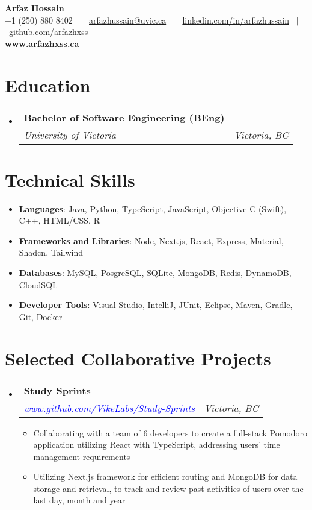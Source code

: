 \documentclass[a4paper,10pt]{article}
\makeatletter
\newcommand{\TechSkillItems}[2]{
  \item \normalsize{\textbf{#1}{: #2}}
}
\newcommand{\resumeItemDot}[1]{
  \item \normalsize{#1}
}
\newcommand{\resumeSubheading}[4]{
  \item
    \begin{tabular*}{\dimexpr\textwidth-1.2em\relax}{@{}l@{\extracolsep{\fill}}r@{}}
      \large \textbf{#1} & \text{#2} \\
      \textit{#3} & \textit{#4} \\
    \end{tabular*}\vspace{-2pt}
}
\newcommand{\resumeSubItem}[2]{\TechSkillItems{#1}{#2}}
\newenvironment{resumeSubHeadingListStart}
{\begin{itemize}[leftmargin=0.15in, label={}]}
{\end{itemize}}
\newenvironment{resumeItemListStart}
{\begin{itemize}[leftmargin=0.15in, label={$\bullet$}]}
{\end{itemize}}
\makeatother
\begin{document}
\begin{center}
    \textbf{\huge Arfaz Hossain} \\ \vspace{2pt}
    +1 (250) 880 8402 \ $|$ \
    \href{mailto:arfazhussain@uvic.ca}
    {arfazhussain@uvic.ca} \ $|$ \ 
    \href{https://www.linkedin.com/in/arfazhussain}{linkedin.com/in/arfazhussain} \ $|$ \ 
    \href{https://github.com/arfazhxss}{github.com/arfazhxss} \vspace{2pt} \\
    \href{https://www.arfazhxss.ca}{\large \textbf{www.arfazhxss.ca}}
\end{center}

\section{Education}
\begin{resumeSubHeadingListStart}
\resumeSubheading
    {Bachelor of Software Engineering (BEng)}
    {Sept. 2021 – Present}
    {University of Victoria}
    {Victoria, BC}
\end{resumeSubHeadingListStart}

\section{Technical Skills}
\begin{resumeSubHeadingListStart}
\resumeSubItem{Languages}{Java, Python, TypeScript, JavaScript, Objective-C (Swift), C++, HTML/CSS, R}
\resumeSubItem{Frameworks and Libraries}{Node, Next.js, React, Express, Material, Shadcn, Tailwind}
\resumeSubItem{Databases}{MySQL, PosgreSQL, SQLite, MongoDB, Redis, DynamoDB, CloudSQL}
\resumeSubItem{Developer Tools}{Visual Studio, IntelliJ, JUnit, Eclipse, Maven, Gradle, Git, Docker}
\end{resumeSubHeadingListStart}

\section{Selected Collaborative Projects}
\begin{resumeSubHeadingListStart}
\resumeSubheading
    {Study Sprints}
    {Feb 2024 – Present}
    {\textcolor{blue}{www.github.com/VikeLabs/Study-Sprints}}
    {Victoria, BC}
\begin{resumeItemListStart}
    \resumeItemDot
    {Collaborating with a team of 6 developers to create a full-stack Pomodoro application utilizing React with TypeScript, addressing users' time management requirements}
    \resumeItemDot
    {Utilizing Next.js framework for efficient routing and MongoDB for data storage and retrieval, to track and review past activities of users over the last day, month and year}
\end{resumeItemListStart}
\end{resumeSubHeadingListStart}
\end{document}
